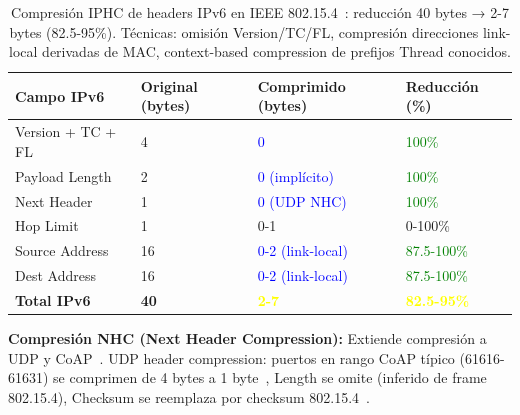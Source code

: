 \begin{table}[h]
\small
\centering
\caption{Compresión IPHC de headers IPv6 en IEEE 802.15.4~\cite{shelby6LoWPANWirelessEmbedded2009}: reducción 40 bytes → 2-7 bytes (82.5-95\%). Técnicas: omisión Version/TC/FL, compresión direcciones link-local derivadas de MAC, context-based compression de prefijos Thread conocidos.}
\label{tab:iphc-compression}
\begin{tabular}{p{3cm}p{2.5cm}p{2.8cm}p{2.2cm}}
\hline
\rowcolor{gray!20}
\textbf{Campo IPv6} & \textbf{Original (bytes)} & \textbf{Comprimido (bytes)} & \textbf{Reducción (\%)} \\
\hline
Version + TC + FL & 4 & \textcolor{blue}{0} & \textcolor{green}{100\%} \\
\hline
Payload Length & 2 & \textcolor{blue}{0 (implícito)} & \textcolor{green}{100\%} \\
\hline
Next Header & 1 & \textcolor{blue}{0 (UDP NHC)} & \textcolor{green}{100\%} \\
\hline
Hop Limit & 1 & 0-1 & 0-100\% \\
\hline
Source Address & 16 & \textcolor{blue}{0-2 (link-local)} & \textcolor{green}{87.5-100\%} \\
\hline
Dest Address & 16 & \textcolor{blue}{0-2 (link-local)} & \textcolor{green}{87.5-100\%} \\
\hline
\textbf{Total IPv6} & \textbf{40} & \textbf{\textcolor{yellow}{2-7}} & \textbf{\textcolor{yellow}{82.5-95\%}} \\
\hline
\end{tabular}
\end{table}

\textbf{Compresión NHC (Next Header Compression):} Extiende compresión a UDP y CoAP~\cite{shelby6LoWPANWirelessEmbedded2009}. UDP header compression: puertos en rango CoAP típico (61616-61631) se comprimen de 4 bytes a 1 byte~\cite{shelby6LoWPANWirelessEmbedded2009}, Length se omite (inferido de frame 802.15.4), Checksum se reemplaza por checksum 802.15.4~\cite{shelby6LoWPANWirelessEmbedded2009}.

